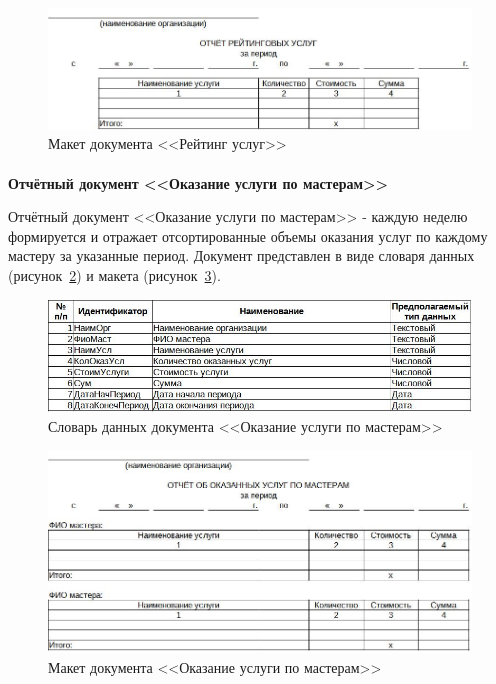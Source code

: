 \documentclass[12pt, a4paper, simple]{eskdtext}
\begin{document}
    \begin{figure}[!h]
        \centering
        \includegraphics[width=14cm]
            {_docs/ОТ_РейтУслуг_макет.jpg}
        \caption{Макет документа <<Рейтинг услуг>>}
        \label{fig:OT_ReitYslyg_maket}
    \end{figure}

    \newpage
    \paragraph{} \textbf{Отчётный документ <<Оказание услуги по мастерам>>}

    Отчётный документ <<Оказание услуги по мастерам>>
    - каждую неделю формируется и отражает отсортированные объемы оказания услуг по каждому мастеру за указанные период.
    Документ представлен в виде словаря данных (рисунок~\ref{fig:OT_OkazYslPoMastery_tipi})
    и макета (рисунок~\ref{fig:OT_OkazYslPoMastery_maket}).

    \begin{figure}[!h]
        \centering
        \includegraphics[width=14cm]
            {_docs/ОТ_ОказУслПоМастеру_типы.jpg}
        \caption{Словарь данных документа <<Оказание услуги по мастерам>>}
        \label{fig:OT_OkazYslPoMastery_tipi}
    \end{figure}

    \begin{figure}[!h]
        \centering
        \includegraphics[width=14cm]
            {_docs/ОТ_ОказУслПоМастеру_макет.jpg}
        \caption{Макет документа <<Оказание услуги по мастерам>>}
        \label{fig:OT_OkazYslPoMastery_maket}
    \end{figure}
\end{document}
